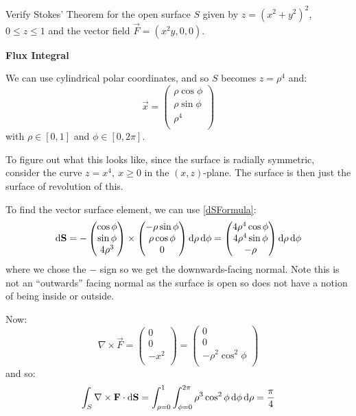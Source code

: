 \documentclass[../main.tex]{subfiles}
\begin{document}
\begin{example}
  Verify Stokes' Theorem for the open surface $S$ given by $z = (x^2 + y^2)^2$, $0 \leq z \leq 1$ and the vector field $\vec{F} = (x^2 y, 0, 0)$.

  \textbf{Flux Integral}\par
  We can use cylindrical polar coordinates, and so $S$ becomes $z = \rho^4$ and:
  \[
    \vec{x} = \begin{pmatrix}
    \rho \cos \phi \\
    \rho \sin \phi \\
    \rho^4 \\
    \end{pmatrix}
  \]
  with $\rho \in [0, 1]$ and $\phi \in [0, 2\pi]$.

  To figure out what this looks like, since the surface is radially symmetric, consider the curve $z = x^4,\ x \geq 0$ in the $(x, z)$-plane.
  The surface is then just the surface of revolution of this.

  To find the vector surface element, we can use \cref{dSFormula}:
  \[
    \d{\vec{S}} = -\begin{pmatrix}
    \cos \phi \\
    \sin \phi \\
    4 \rho^3 \\
    \end{pmatrix} \times \begin{pmatrix}
    -\rho \sin \phi \\
    \rho \cos \phi \\
    0 \\
    \end{pmatrix} \d{\rho}\d{\phi} = \begin{pmatrix}
    4\rho^4 \cos \phi \\
    4\rho^4 \sin \phi \\
    -\rho \\
    \end{pmatrix} \d{\rho}\d{\phi}
  \]
  where we chose the $-$ sign so we get the downwards-facing normal.
  Note this is not an ``outwards'' facing normal as the surface is open so does not have a notion of being inside or outside.

  Now:
  \[
    \nabla \times \vec{F} = \begin{pmatrix}
    0 \\
    0 \\
    -x^2 \\
    \end{pmatrix} = \begin{pmatrix}
    0 \\
    0 \\
    -\rho^2 \cos^2 \phi \\
    \end{pmatrix}
  \]
  and so:
  \[
    \int_{S} \nabla \times \vec{F} \cdot \d{\vec{S}} = \int_{\rho = 0}^{1} \int_{\phi = 0}^{2\pi} \rho^3 \cos^2 \phi \d{\phi} \d{\rho} = \frac{\pi}{4}
  \]


\end{example}
\end{document}
